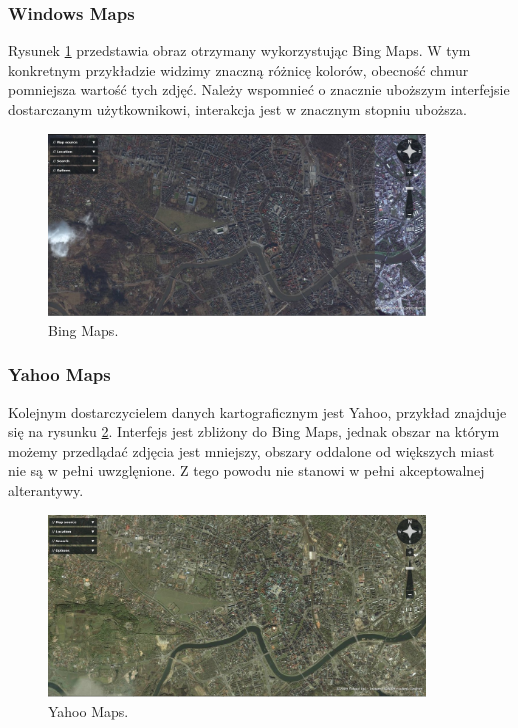\subsubsection{Windows Maps}
\label{subsubsec:Windows Maps}

Rysunek \ref{fig:bingMaps_1} przedstawia obraz otrzymany wykorzystując Bing Maps. W tym konkretnym przykładzie widzimy znaczną różnicę kolorów, obecność chmur pomniejsza wartość tych zdjęć. Należy wspomnieć o znacznie uboższym interfejsie dostarczanym użytkownikowi, interakcja jest w znacznym stopniu uboższa.

\begin{figure}[H]
  \centering
    \includegraphics[width=100mm]{ge/bing_1.jpg}
  \caption{Bing Maps.}
  \label{fig:bingMaps_1}
\end{figure}

\subsubsection{Yahoo Maps}
\label{subsubsec:Yahoo Maps}

Kolejnym dostarczycielem danych kartograficznym jest Yahoo, przykład znajduje się na rysunku \ref{fig:yahooMaps_1}. Interfejs jest zbliżony do Bing Maps, jednak obszar na którym możemy przedlądać zdjęcia jest mniejszy, obszary oddalone od większych miast nie są w pełni uwzglęnione. Z tego powodu nie stanowi w pełni akceptowalnej alterantywy.

\begin{figure}[H]
  \centering
    \includegraphics[width=100mm]{ge/yahoo_1.jpg}
  \caption{Yahoo Maps.}
  \label{fig:yahooMaps_1}
\end{figure}


